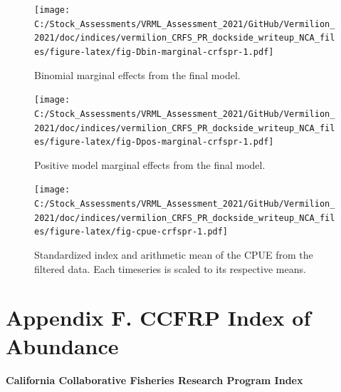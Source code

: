 \documentclass[11pt,
  english,
]{article}
\begin{document}
\begin{figure}
\centering
\texttt{[image: C:/Stock\_Assessments/VRML\_Assessment\_2021/GitHub/Vermilion\_2021/doc/indices/vermilion\_CRFS\_PR\_dockside\_writeup\_NCA\_files/figure-latex/fig-Dbin-marginal-crfspr-1.pdf]}
\caption{\label{fig:fig-Dbin-marginal-crfspr}Binomial marginal effects from the final model.}
\end{figure}

\begin{figure}
\centering
\texttt{[image: C:/Stock\_Assessments/VRML\_Assessment\_2021/GitHub/Vermilion\_2021/doc/indices/vermilion\_CRFS\_PR\_dockside\_writeup\_NCA\_files/figure-latex/fig-Dpos-marginal-crfspr-1.pdf]}
\caption{\label{fig:fig-Dpos-marginal-crfspr}Positive model marginal effects from the final model.}
\end{figure}

\begin{figure}
\centering
\texttt{[image: C:/Stock\_Assessments/VRML\_Assessment\_2021/GitHub/Vermilion\_2021/doc/indices/vermilion\_CRFS\_PR\_dockside\_writeup\_NCA\_files/figure-latex/fig-cpue-crfspr-1.pdf]}
\caption{\label{fig:fig-cpue-crfspr}Standardized index and arithmetic mean of the CPUE from the filtered data. Each timeseries is scaled to its respective means.}
\end{figure}

\newpage


\hypertarget{appendix-f.-ccfrp-index-of-abundance}{%
\section*{Appendix F. CCFRP Index of Abundance}\label{appendix-f.-ccfrp-index-of-abundance}}

\leavevmode\tagmcend\tagstructend

\renewcommand{\thepage}{F\arabic{page}}
\renewcommand{\thefigure}{F\arabic{figure}}
\renewcommand{\thetable}{F\arabic{table}}
\setcounter{page}{1}
\setcounter{figure}{0}
\setcounter{table}{0}

\textbf{California Collaborative Fisheries Research Program Index}
\end{document}
